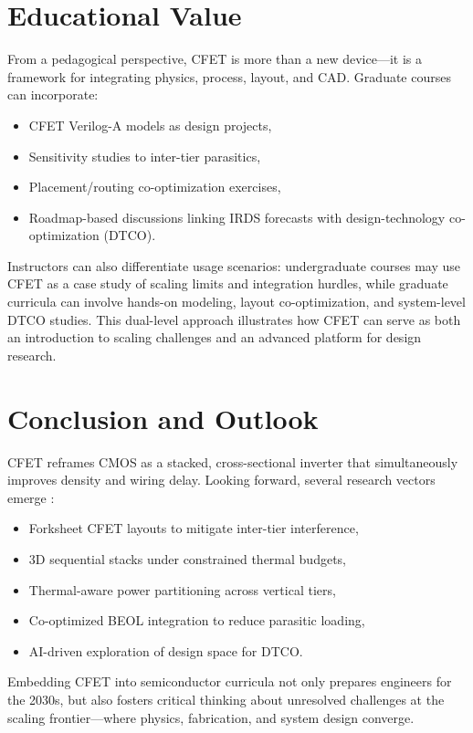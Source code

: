 \documentclass[conference]{IEEEtran}
\begin{document}
\section{Educational Value}
From a pedagogical perspective, CFET is more than a new device—it is a framework for integrating physics, process, layout, and CAD.
Graduate courses can incorporate:
\begin{itemize}
  \item CFET Verilog-A models as design projects,
  \item Sensitivity studies to inter-tier parasitics,
  \item Placement/routing co-optimization exercises,
  \item Roadmap-based discussions linking IRDS forecasts with design-technology co-optimization (DTCO).
\end{itemize}
Instructors can also differentiate usage scenarios:
undergraduate courses may use CFET as a case study of scaling limits and integration hurdles,
while graduate curricula can involve hands-on modeling, layout co-optimization, and system-level DTCO studies.
This dual-level approach illustrates how CFET can serve as both an introduction to scaling challenges and an advanced platform for design research.

\section{Conclusion and Outlook}
CFET reframes CMOS as a stacked, cross-sectional inverter that simultaneously improves density and wiring delay.
Looking forward, several research vectors emerge \cite{colinge_cfet_review2021,irds_2023}:
\begin{itemize}
  \item Forksheet CFET layouts to mitigate inter-tier interference,
  \item 3D sequential stacks under constrained thermal budgets,
  \item Thermal-aware power partitioning across vertical tiers,
  \item Co-optimized BEOL integration to reduce parasitic loading,
  \item AI-driven exploration of design space for DTCO.
\end{itemize}
Embedding CFET into semiconductor curricula not only prepares engineers for the 2030s,
but also fosters critical thinking about unresolved challenges at the scaling frontier---where physics, fabrication, and system design converge.
\end{document}
